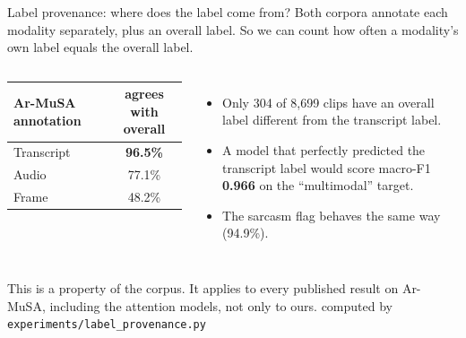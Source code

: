 \documentclass[aspectratio=169,10pt]{beamer}
\newcommand{\source}[1]{\vfill\hfill{\scriptsize\textcolor{MutedGray}{#1}}}
\begin{document}
\begin{frame}[t]{Label provenance: where does the label come from?}
Both corpora annotate each modality separately, plus an overall label.
So we can count how often a modality's own label equals the overall label.

\vspace{0.3cm}
\begin{columns}[T,onlytextwidth]
\centering
\begin{tabular}{@{}lc@{}}
\toprule
Ar-MuSA annotation & agrees with overall \\
\midrule
Transcript & \textbf{96.5\%} \\
Audio      & 77.1\% \\
Frame      & 48.2\% \\
\bottomrule
\end{tabular}
\begin{itemize}
\item Only 304 of 8,699 clips have an overall label different from the transcript label.
\item A model that perfectly predicted the transcript label would score
      macro-F1 \textbf{0.966} on the ``multimodal'' target.
\item The sarcasm flag behaves the same way (94.9\%).
\end{itemize}
\end{columns}
\vspace{0.4cm}
\small This is a property of the corpus. It applies to every published result on
Ar-MuSA, including the attention models, not only to ours.
\source{computed by \texttt{experiments/label\_provenance.py}}
\end{frame}
\end{document}
